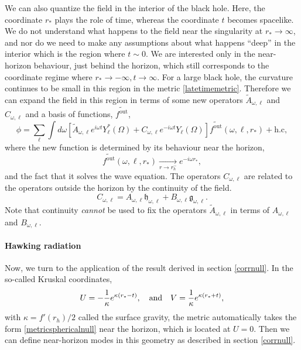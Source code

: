 \documentclass[12pt]{article}
\def\fout{f^{\text{out}}}
\def\grey{\mathfrak{g}}
\def\white{\mathfrak{h}}
\def\rtor{{r_*}}
\newcommand{\be}{\begin{equation}}
\newcommand{\ee}{\end{equation}}
\begin{document}
We can also quantize the field in the interior of the black hole. Here, the coordinate $\rtor$ plays the role of time, whereas the coordinate $t$ becomes spacelike. We do not understand what happens to the field near the singularity at $\rtor \rightarrow \infty$, and nor do we need to make any assumptions about what happens ``deep'' in the interior which is the region where $t \sim 0$.  We are interested only in the near-horizon behaviour, just behind the horizon, which still corresponds to the coordinate regime where $\rtor \rightarrow -\infty, t \rightarrow \infty$.  For a large black hole, the curvature continues to be small in this region in the  metric \eqref{latetimemetric}. Therefore we can
expand the field in this region in terms of some new operators $\widetilde{A}_{\omega, \ell}$ and $C_{\omega, \ell}$ and a basis of functions, $\widetilde{\fout}$,
\be
\label{fieldinside}
\phi = \sum_{\ell} \int d \omega \left[\widetilde{A}_{\omega, \ell} e^{i \omega t} Y_{\ell}^*(\Omega) + C_{\omega, \ell} e^{-i \omega t} Y_{\ell}(\Omega)  \right]  \widetilde{\fout}(\omega, \ell,\rtor)   + \text{h.c},
\ee
where the new function is determined by its behaviour near the horizon,
\be
\label{ftexpansion}
\widetilde{\fout}(\omega, \ell, \rtor) \underset{r \rightarrow r_h^-}{\longrightarrow} e^{-i \omega \rtor},
\ee
and the fact that it solves the wave equation. The operators $C_{\omega, \ell}$ are related to the operators outside the horizon by the continuity of the field.\be
C_{\omega, \ell} = A_{\omega, \ell} \white_{\omega, \ell} + B_{\omega, \ell} \grey_{\omega, \ell}.
\ee
Note that continuity {\em cannot} be used to fix the operators $\widetilde{A}_{\omega, \ell}$ in terms of $A_{\omega, \ell}$ and $B_{\omega, \ell}$.


\paragraph{\bf Hawking radiation \\}
Now, we turn to the application of the result derived in section \ref{corrnull}. In the  so-called Kruskal coordinates,
\be
\label{kruskaldef}
U = -{1 \over \kappa} e^{\kappa (\rtor - t)}, \quad \text{and} \quad V = {1 \over \kappa} e^{\kappa(\rtor + t)},
\ee
with $\kappa = f'(r_h)/2$ called the surface gravity, the metric
automatically takes the form \eqref{metricsphericalnull} near the horizon, which is located at $U = 0$. Then we can define near-horizon modes in this geometry as described in section \ref{corrnull}.
\end{document}
